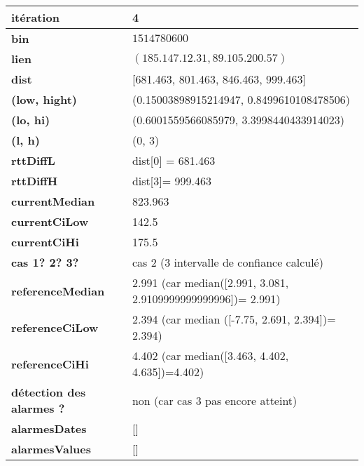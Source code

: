 	\begin{table}[H]
	\centering
	
	\begin{tabularx}{\linewidth}{|l|X| }
		\hline
		\textbf{itération} & 4	\\ \hline
		\textbf{bin} & $1514780600$ \\ \hline
		\textbf{lien} & $(185.147.12.31, 89.105.200.57)$  \\ \hline
		\textbf{dist}& [681.463, 801.463, 846.463, 999.463]	\\ \hline
		\textbf{(low, hight)}& (0.15003898915214947, 0.8499610108478506) 	\\ \hline
		\textbf{(lo, hi)}&(0.6001559566085979, 3.3998440433914023)  \\ \hline
		\textbf{(l, h)} & (0, 3) 	\\ \hline
		\textbf{rttDiffL}& dist[0] = 681.463	\\ \hline
		\textbf{rttDiffH}& dist[3]= 999.463	\\ \hline
		\textbf{currentMedian}& 823.963	\\ \hline
		\textbf{currentCiLow}& 142.5 	\\ \hline
		\textbf{currentCiHi}& 175.5	\\ \hline
		\textbf{cas 1? 2? 3?}& cas 2 (3 intervalle de confiance calculé)  \\ \hline
		\textbf{referenceMedian}& 2.991 (car median([2.991, 3.081, 2.9109999999999996])= 2.991)	\\ \hline
		\textbf{referenceCiLow}& 2.394 (car median ([-7.75, 2.691, 2.394])= 2.394)	\\ \hline
		\textbf{referenceCiHi}& 4.402 (car median([3.463, 4.402, 4.635])=4.402)	\\ \hline
		\textbf{détection des alarmes ?}& non (car cas 3 pas  encore atteint)	\\ \hline
		\textbf{alarmesDates}& []	\\ \hline
		\textbf{alarmesValues}& []	\\ \hline
		
	\end{tabularx}
\end{table}







